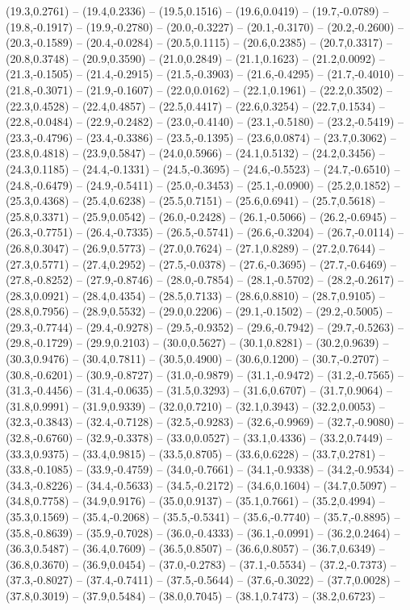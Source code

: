 \documentclass{SVnote}
\begin{document}
(19.3,0.2761) -- (19.4,0.2336) -- (19.5,0.1516) -- (19.6,0.0419) -- (19.7,-0.0789) -- (19.8,-0.1917) -- (19.9,-0.2780) -- (20.0,-0.3227) -- (20.1,-0.3170) -- (20.2,-0.2600) -- (20.3,-0.1589) -- (20.4,-0.0284) -- (20.5,0.1115) -- (20.6,0.2385) -- (20.7,0.3317) -- (20.8,0.3748) -- (20.9,0.3590) -- (21.0,0.2849) -- (21.1,0.1623) -- (21.2,0.0092) -- (21.3,-0.1505) -- (21.4,-0.2915) -- (21.5,-0.3903) -- (21.6,-0.4295) -- (21.7,-0.4010) -- (21.8,-0.3071) -- (21.9,-0.1607) -- (22.0,0.0162) -- (22.1,0.1961) -- (22.2,0.3502) -- (22.3,0.4528) -- (22.4,0.4857) -- (22.5,0.4417) -- (22.6,0.3254) -- (22.7,0.1534) -- (22.8,-0.0484) -- (22.9,-0.2482) -- (23.0,-0.4140) -- (23.1,-0.5180) -- (23.2,-0.5419) -- (23.3,-0.4796) -- (23.4,-0.3386) -- (23.5,-0.1395) -- (23.6,0.0874) -- (23.7,0.3062) -- (23.8,0.4818) -- (23.9,0.5847) -- (24.0,0.5966) -- (24.1,0.5132) -- (24.2,0.3456) -- (24.3,0.1185) -- (24.4,-0.1331) -- (24.5,-0.3695) -- (24.6,-0.5523) -- (24.7,-0.6510) -- (24.8,-0.6479) -- (24.9,-0.5411) -- (25.0,-0.3453) -- (25.1,-0.0900) -- (25.2,0.1852) -- (25.3,0.4368) -- (25.4,0.6238) -- (25.5,0.7151) -- (25.6,0.6941) -- (25.7,0.5618) -- (25.8,0.3371) -- (25.9,0.0542) -- (26.0,-0.2428) -- (26.1,-0.5066) -- (26.2,-0.6945) -- (26.3,-0.7751) -- (26.4,-0.7335) -- (26.5,-0.5741) -- (26.6,-0.3204) -- (26.7,-0.0114) -- (26.8,0.3047) -- (26.9,0.5773) -- (27.0,0.7624) -- (27.1,0.8289) -- (27.2,0.7644) -- (27.3,0.5771) -- (27.4,0.2952) -- (27.5,-0.0378) -- (27.6,-0.3695) -- (27.7,-0.6469) -- (27.8,-0.8252) -- (27.9,-0.8746) -- (28.0,-0.7854) -- (28.1,-0.5702) -- (28.2,-0.2617) -- (28.3,0.0921) -- (28.4,0.4354) -- (28.5,0.7133) -- (28.6,0.8810) -- (28.7,0.9105) -- (28.8,0.7956) -- (28.9,0.5532) -- (29.0,0.2206) -- (29.1,-0.1502) -- (29.2,-0.5005) -- (29.3,-0.7744) -- (29.4,-0.9278) -- (29.5,-0.9352) -- (29.6,-0.7942) -- (29.7,-0.5263) -- (29.8,-0.1729) -- (29.9,0.2103) -- (30.0,0.5627) -- (30.1,0.8281) -- (30.2,0.9639) -- (30.3,0.9476) -- (30.4,0.7811) -- (30.5,0.4900) -- (30.6,0.1200) -- (30.7,-0.2707) -- (30.8,-0.6201) -- (30.9,-0.8727) -- (31.0,-0.9879) -- (31.1,-0.9472) -- (31.2,-0.7565) -- (31.3,-0.4456) -- (31.4,-0.0635) -- (31.5,0.3293) -- (31.6,0.6707) -- (31.7,0.9064) -- (31.8,0.9991) -- (31.9,0.9339) -- (32.0,0.7210) -- (32.1,0.3943) -- (32.2,0.0053) -- (32.3,-0.3843) -- (32.4,-0.7128) -- (32.5,-0.9283) -- (32.6,-0.9969) -- (32.7,-0.9080) -- (32.8,-0.6760) -- (32.9,-0.3378) -- (33.0,0.0527) -- (33.1,0.4336) -- (33.2,0.7449) -- (33.3,0.9375) -- (33.4,0.9815) -- (33.5,0.8705) -- (33.6,0.6228) -- (33.7,0.2781) -- (33.8,-0.1085) -- (33.9,-0.4759) -- (34.0,-0.7661) -- (34.1,-0.9338) -- (34.2,-0.9534) -- (34.3,-0.8226) -- (34.4,-0.5633) -- (34.5,-0.2172) -- (34.6,0.1604) -- (34.7,0.5097) -- (34.8,0.7758) -- (34.9,0.9176) -- (35.0,0.9137) -- (35.1,0.7661) -- (35.2,0.4994) -- (35.3,0.1569) -- (35.4,-0.2068) -- (35.5,-0.5341) -- (35.6,-0.7740) -- (35.7,-0.8895) -- (35.8,-0.8639) -- (35.9,-0.7028) -- (36.0,-0.4333) -- (36.1,-0.0991) -- (36.2,0.2464) -- (36.3,0.5487) -- (36.4,0.7609) -- (36.5,0.8507) -- (36.6,0.8057) -- (36.7,0.6349) -- (36.8,0.3670) -- (36.9,0.0454) -- (37.0,-0.2783) -- (37.1,-0.5534) -- (37.2,-0.7373) -- (37.3,-0.8027) -- (37.4,-0.7411) -- (37.5,-0.5644) -- (37.6,-0.3022) -- (37.7,0.0028) -- (37.8,0.3019) -- (37.9,0.5484) -- (38.0,0.7045) -- (38.1,0.7473) -- (38.2,0.6723) -- 
\end{document}
